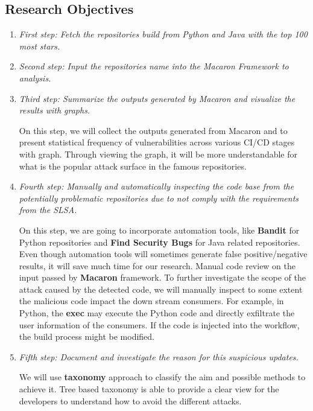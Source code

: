 \subsection{Research Objectives}
\begin{enumerate}
    \item \emph{First step: Fetch the repositories build from Python and Java with the top 100 most stars.}
    \item \emph{Second step: Input the repositories name into the Macaron Framework to analysis.}
    \item \emph{Third step: Summarize the outputs generated by Macaron and visualize the results with graphs.}
    
    On this step, we will collect the outputs generated from Macaron and to present statistical frequency of vulnerabilities across various CI/CD stages with graph.
    Through viewing the graph, it will be more understandable for what is the popular attack surface in the famous repositories. 
    \item \emph{Fourth step: Manually and automatically inspecting the code base from the potentially problematic repositories 
    due to not comply with the requirements from the SLSA.}
    
    On this step, we are going to incorporate automation tools, like \textbf{Bandit} for Python repositories and \textbf{Find Security Bugs} for Java related repositories.
    Even though automation tools will sometimes generate false positive/negative results, it will save much time for our research.
    Manual code review on the input passed by \textbf{Macaron} framework. To further investigate the scope of the attack caused by
    the detected code, we will manually inspect to some extent the malicious code impact the down stream consumers.
    For example, in Python, the \textbf{exec} may execute the Python code and directly exfiltrate the user information of the consumers.
    If the code is injected into the workflow, the build process might be modified.

    \item \emph{Fifth step: Document and investigate the reason for this suspicious updates.}
    
    We will use \textbf{taxonomy} approach to classify the aim and possible methods to achieve it. Tree based taxonomy is able to 
    provide a clear view for the developers to understand how to avoid the different attacks. 
\end{enumerate}
